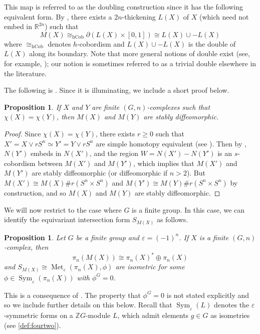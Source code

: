 \documentclass[11pt,a4paper,leqno]{amsart}
\newtheorem{proposition}[theorem]{Proposition}
\theoremstyle{definition}
\theoremstyle{remark}
\newcommand{\R}{\mathbb{R}}
\DeclareMathOperator{\hCob}{hCob}
\newcommand{\bZ}{\mathbb Z}
\newcommand{\ZG}{\bZ G}
\DeclareMathOperator{\Met}{Met}
\newcommand{\ep}{\varepsilon}
\newcommand{\bd}{\partial}
\DeclareMathOperator{\Sym}{Sym}
\begin{document}
This map is referred to as the doubling construction since it has the following equivalent form. By \cite[Proposition II.2]{Kreck:1984}, there exists a $2n$-thickening $L(X)$ of $X$ (which need not embed in $\R^{2n}$) such that
\[ M(X) \cong_{\hCob} \bd(L(X) \times [0,1]) \cong L(X) \cup -L(X) \] 
where $\cong_{\hCob}$ denotes $h$-cobordism and $L(X) \cup -L(X)$ is the double of $L(X)$ along its boundary. 
Note that more general notions of double exist (see, for example, \cite{Hambleton:2009,NNP24}); our notion is sometimes referred to as a trivial double elsewhere in the literature.

The following is \cite[Proposition I.1]{Kreck:1984}. Since it is illuminating, we include a short proof below.

\begin{proposition} \label{prop:stable} 
If $X$ and $Y$ are  finite $(G,n)$-complexes such that $\chi(X) = \chi(Y)$, then $M(X)$ and $M(Y)$ are stably diffeomorphic.
\end{proposition}

\begin{proof} Since $\chi(X) = \chi(Y)$, there exists $r \geq 0$ such that $X' = X \vee rS^n \simeq Y' = Y \vee rS^n$ are simple homotopy equivalent (see \cite{Whitehead:1939}). Then by \cite[Corollary 2.1]{Wall:1966}, $N(Y')$ embeds in $N(X')$, and the region $W = N(X') - N(Y')$ is an $s$-cobordism between $M(X')$ and $M(Y')$,  which implies that $M(X')$ and $M(Y')$ are stably diffeomorphic (or diffeomorphic if $n > 2$).
 But $M(X') \cong M(X)\# r(S^n \times S^n)$ and $M(Y') \cong M(Y) \# r(S^n \times S^n)$ by construction, and so $M(X)$ and $M(Y)$ are stably diffeomorphic.
\end{proof}

We will now restrict to the case where $G$ is a finite group. 
In this case, we can identify the equivariant intersection form $S_{M(X)}$ as follows.

\begin{proposition}
\label{prop:intdouble}
Let $G$ be a finite group and $\ep = (-1)^n$. If $X$ is a finite $(G,n)$-complex, then 
$$\pi_n(M(X)) \cong \pi_n(X)^* \oplus \pi_n(X)$$ and $S_{M(X)} \cong \Met_\ep(\pi_n(X), \phi)$  are isometric for some $\phi\in \Sym_\ep(\pi_n(X))$ with $\phi^G = 0$.
\end{proposition}

This is a consequence of \cite[Proposition II.2]{Kreck:1984}. The property that $\phi^G=0$ is not stated explicitly and so we include further details on this below. Recall that $\Sym_\ep(L)$ denotes the $\ep$-symmetric forms on a $\ZG$-module $L$, which admit elements $g \in G$ as isometries (see \cref{def:fourtwo}).
\end{document}
